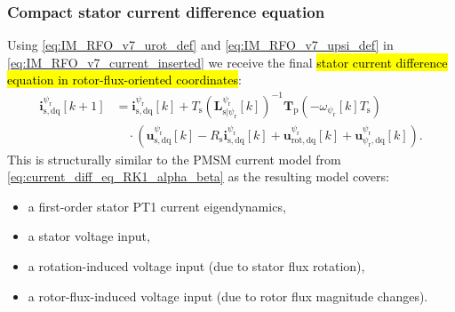 \begin{frame}
    \frametitle{Compact stator current difference equation}
    Using \eqref{eq:IM_RFO_v7_urot_def} and \eqref{eq:IM_RFO_v7_upsi_def} in \eqref{eq:IM_RFO_v7_current_inserted} we receive the final \hl{stator current difference equation in rotor-flux-oriented coordinates}:
    \begin{equation}
        \begin{aligned}
            \bm{i}^{\psi_\mathrm{r}}_{\mathrm{s},\mathrm{dq}}[k+1]
             & =\bm{i}^{\psi_\mathrm{r}}_{\mathrm{s},\mathrm{dq}}[k]
            +T_\mathrm{s}\left(\bm{L}^{\psi_\mathrm{r}}_{\mathrm{s}|\psi_\mathrm{r}}[k]\right)^{-1}
            \bm{T}_\mathrm{p}(-\omega_{\psi_\mathrm{r}}[k]T_\mathrm{s}) \\
             & \quad\cdot\left(
            \bm{u}^{\psi_\mathrm{r}}_{\mathrm{s},\mathrm{dq}}[k]
            -R_\mathrm{s}\bm{i}^{\psi_\mathrm{r}}_{\mathrm{s},\mathrm{dq}}[k]
            +\bm{u}^{\psi_\mathrm{r}}_{\mathrm{rot},\mathrm{dq}}[k]
            +\bm{u}^{\psi_\mathrm{r}}_{\psi_\mathrm{r},\mathrm{dq}}[k]
            \right).
        \end{aligned}
        \label{eq:IM_RFO_v7_compact_current_model}
    \end{equation}\pause%
    This is structurally similar to the PMSM current model from \eqref{eq:current_diff_eq_RK1_alpha_beta} as the resulting model covers:
    \begin{itemize}
        \item a first-order stator PT1 current eigendynamics,\pause%
        \item a stator voltage input,\pause%
        \item a rotation-induced voltage input (due to stator flux rotation),\pause%
        \item a rotor-flux-induced voltage input (due to rotor flux magnitude changes).
    \end{itemize}
\end{frame}


